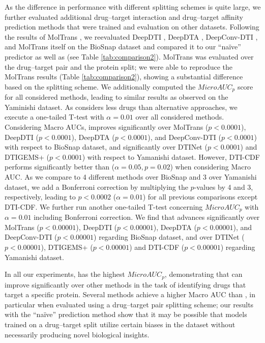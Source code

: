 \documentclass{bioinfo}
\renewcommand{\cite}{\citep}
\begin{document}
As the difference in performance with different splitting schemes is
quite large, we further evaluated additional drug--target interaction
and drug--target affinity prediction methods that were trained and
evaluation on other datasets.  Following the results of MolTrans
\cite{MolTrans2020}, we reevaluated DeepDTI \cite{DeepDTI2017},
DeepDTA \cite{DeepDTA2018}, DeepConv-DTI \cite{DeepConvDTI2019}, and
MolTrans itself on the BioSnap dataset \cite{BioSnap2018} and compared it to our
``na\"ive'' predictor as well as \name{} (see Table
\ref{tab:comparison2}).  MolTrans was evaluated over the drug--target
pair and the protein split; we were able to reproduce the MolTrans
results (Table \ref{tab:comparison2}), showing a substantial
difference based on the splitting scheme. We additionally computed the
$MicroAUC_p$ score for all considered methods, leading to similar 
results as observed on the Yaminishi dataset. As \name{} considers less drugs than alternative approaches, we execute a one-tailed T-test with $\alpha=0.01$ over all considered methods. Considering Macro AUCs, \name{} improves significantly over MolTrans ($p<0.0001$), DeepDTI ($p<0.0001$), DeepDTA ($p<0.0001$), and DeepConv-DTI ($p<0.0001$) with respect to BioSnap dataset, and significantly over DTINet ($p<0.0001$) and DTIGEMS+ ($p<0.0001$) with respect to Yamanishi dataset. However, DTI-CDF performs significantly better than \name{} ($\alpha=0.05, p=0.02$) when considering Macro AUC. As we compare \name{} to 4 different methods over BioSnap and 3 over Yamanishi dataset, we add a Bonferroni correction by multiplying the $p$-values by 4 and 3, respectively, leading to $p<0.0002$ ($\alpha=0.01$) for all previous comparisons except DTI-CDF. We further run another one-tailed T-test concerning $MicroAUC_p$ with $\alpha=0.01$ including Bonferroni correction. We find that \name{} advances significantly over MolTrans ($p<0.00001$), DeepDTI ($p<0.00001$), DeepDTA ($p<0.00001$), and DeepConv-DTI ($p<0.00001$) regarding BioSnap dataset, and over DTINet ($p<0.00001$), DTIGEMS+ ($p<0.00001$) and DTI-CDF ($p<0.00001$) regarding Yamanishi dataset.

In all our experiments, \name{} has the highest $MicroAUC_p$,
demonstrating that \name{} can improve significantly over other methods in the task
of identifying drugs that target a specific protein. Several methods
achieve a higher Macro AUC than \name{}, in particular when evaluated
using a drug--target pair splitting scheme; our results with the
``na\"ive'' prediction method show that it may be possible that models
trained on a drug--target split utilize certain biases in the dataset
without necessarily producing novel biological insights.
\end{document}

